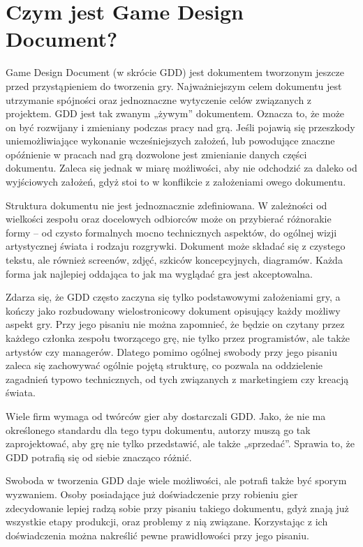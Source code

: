 \documentclass[openright]{xmgr}
\begin{document}
\chapter{Czym jest Game Design Document?}

Game Design Document (w skrócie GDD) jest dokumentem tworzonym jeszcze przed przystąpieniem do tworzenia gry. Najważniejszym celem dokumentu jest utrzymanie spójności oraz jednoznaczne wytyczenie celów związanych z projektem. GDD jest tak zwanym „żywym” dokumentem. Oznacza to, że może on być rozwijany i zmieniany podczas pracy nad grą. Jeśli pojawią się przeszkody uniemożliwiające wykonanie wcześniejszych założeń, lub powodujące znaczne opóźnienie w pracach nad grą dozwolone jest zmienianie danych części dokumentu. Zaleca się jednak w miarę możliwości, aby nie odchodzić za daleko od wyjściowych założeń, gdyż stoi to w konflikcie z założeniami owego dokumentu.

Struktura dokumentu nie jest jednoznacznie zdefiniowana. W zależności od wielkości zespołu oraz docelowych odbiorców może on przybierać różnorakie formy – od czysto formalnych mocno technicznych aspektów, do ogólnej wizji artystycznej świata i rodzaju rozgrywki. Dokument może składać się z czystego tekstu, ale również screenów, zdjęć, szkiców koncepcyjnych, diagramów. Każda forma jak najlepiej oddająca to jak ma wyglądać gra jest akceptowalna.

Zdarza się, że GDD często zaczyna się tylko podstawowymi założeniami gry, a kończy jako rozbudowany wielostronicowy dokument opisujący każdy możliwy aspekt gry. Przy jego pisaniu nie można zapomnieć, że   będzie on czytany przez każdego członka zespołu tworzącego grę, nie tylko przez programistów, ale także artystów czy managerów. Dlatego pomimo ogólnej swobody przy jego pisaniu zaleca się zachowywać ogólnie pojętą strukturę, co pozwala na oddzielenie zagadnień typowo technicznych, od tych związanych z marketingiem czy kreacją świata.

Wiele firm wymaga od twórców gier aby dostarczali GDD. Jako, że nie ma określonego standardu dla tego typu dokumentu, autorzy muszą go tak zaprojektować, aby grę nie tylko przedstawić, ale także „sprzedać”. Sprawia to, że GDD potrafią się od siebie znacząco różnić.

Swoboda w tworzenia GDD daje wiele możliwości, ale potrafi także być sporym wyzwaniem. Osoby posiadające już doświadczenie przy robieniu gier zdecydowanie lepiej radzą sobie przy pisaniu takiego dokumentu, gdyż znają już wszystkie etapy produkcji, oraz problemy z nią związane. Korzystając z ich doświadczenia można nakreślić pewne prawidłowości przy jego pisaniu.
\end{document}
